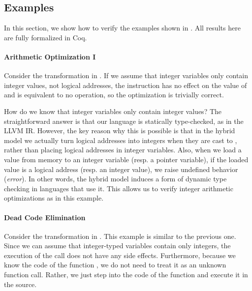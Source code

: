 \subsection{Examples}
\label{sec:intptrcast:compiler-verification:examples}

In this section, we show how to verify the examples shown in .
All results here are fully formalized in Coq.

\paragraph{Arithmetic Optimization I}

Consider the transformation in . If we assume that
integer variables only contain integer values, not logical addresses, the instruction  has no effect on the value of  and is equivalent to no operation, so
the optimization is trivially correct.

How do we know that integer variables only contain
integer values? The straightforward answer is that our language is statically type-checked, as in the LLVM IR. However, the key reason why this is possible
is that in the hybrid model we actually turn logical addresses into integers
when they are cast to , rather than placing logical addresses in integer
variables. Also, when we load a value from memory to an integer 
variable (resp. a pointer variable), 
if the loaded value is a logical address (resp. an integer value), we raise undefined
behavior (\ie \emph{error}).
In other words, the hybrid model induces a form of dynamic type
checking in languages that use it. This allows us to verify integer
arithmetic optimizations as in this example.

\paragraph{Dead Code Elimination}

Consider the transformation in .  This example
is similar to the previous one.  Since we can assume that integer-typed
variables contain only integers, the execution of the call
 does not have any side effects.
Furthermore, because we know the code of the function
, we do not need to treat it as an unknown function call.
Rather, we just step into the code of the function  and
execute it in the source.%

